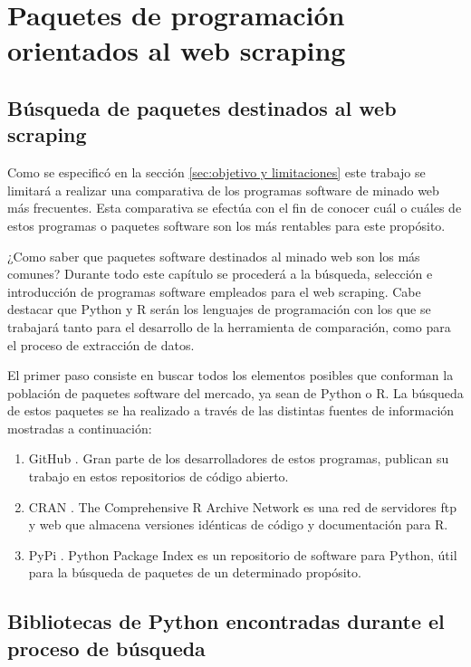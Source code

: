 \chapter{Paquetes de programación orientados al web scraping}
\label{cha:paquetes de programacion orientados al web scraping}

\section{Búsqueda de paquetes destinados al web scraping}
\label{sec:busqueda de paquetes destinados al web scraping}

Como se especificó en la sección \ref{sec:objetivo y limitaciones} este trabajo se limitará a realizar
una comparativa de los programas software de minado web más frecuentes. Esta comparativa se efectúa con el
fin de conocer cuál o cuáles de estos programas o paquetes software son los más rentables para este propósito.

¿Como saber que paquetes software destinados al minado web son los más comunes? Durante todo este capítulo
se procederá a la búsqueda, selección e introducción de programas software empleados para el web scraping. 
Cabe destacar que Python y R serán los lenguajes de programación con los que se trabajará tanto para el 
desarrollo de la herramienta de comparación, como para el proceso de extracción de datos.

El primer paso consiste en buscar todos los elementos posibles que conforman la población de paquetes
software del mercado, ya sean de Python o R. La búsqueda de estos paquetes se ha realizado a través de las 
distintas fuentes de información mostradas a continuación:

\begin{enumerate}
  \item GitHub \cite{github}. Gran parte de los desarrolladores de estos programas, publican su trabajo en
  estos repositorios de código abierto.
  \item CRAN \cite{cran}. The Comprehensive R Archive Network es una red de servidores ftp y web que
  almacena versiones idénticas de código y documentación para R.
  \item PyPi \cite{pypi}. Python Package Index es un repositorio de software para Python, útil para la
  búsqueda de paquetes de un determinado propósito.
\end{enumerate}

\section{Bibliotecas de Python encontradas durante el proceso de búsqueda}
\label{sec:bibliotecas de python encontradas durante el proceso de busqueda}

